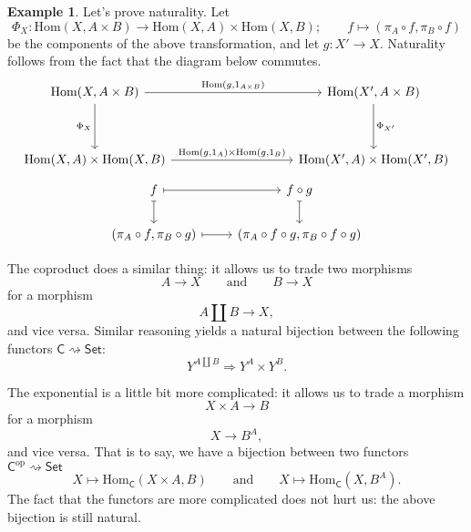 \documentclass[a4paper]{report}
\newcommand{\Hom}{\mathrm{Hom}}
\theoremstyle{definition}
\newtheorem{example}{Example}[section]
\theoremstyle{plain}
\theoremstyle{remark}
\begin{document}
\begin{example}
  Let's prove naturality. Let
  \begin{equation*}
    \Phi_{X}\colon \Hom(X, A \times B) \to \Hom(X, A) \times \Hom(X, B);\qquad f \mapsto (\pi_{A} \circ f, \pi_{B} \circ f)
  \end{equation*}
  be the components of the above transformation, and let $g\colon X' \to X$. Naturality follows from the fact that the diagram below commutes.
  \begin{equation*}
    \begin{tikzcd}[row sep=huge, column sep=huge]
      \Hom(X, A \times B)
      \arrow[rr, "{\Hom(g, 1_{A \times B})}"]
      \arrow[d, swap, "\Phi_{X}"]
      & & \Hom(X', A \times B)
      \arrow[d, "\Phi_{X'}"]
      \\
      \Hom(X, A) \times \Hom(X, B)
      \arrow[rr, "{\Hom(g, 1_{A}) \times \Hom(g, 1_{B})}"]
      & & \Hom(X', A) \times \Hom(X', B)
    \end{tikzcd}
  \end{equation*}
  \begin{equation*}
    \begin{tikzcd}
      f
      \arrow[r, mapsto]
      \arrow[d, mapsto]
      & f \circ g
      \arrow[d, mapsto]
      \\
      (\pi_{A} \circ f, \pi_{B} \circ g)
      \arrow[r, mapsto]
      & (\pi_{A} \circ f \circ g, \pi_{B} \circ f \circ g)
    \end{tikzcd}
  \end{equation*}

  The coproduct does a similar thing: it allows us to trade two morphisms
  \begin{equation*}
    A \to X\qquad\text{and}\qquad B \to X
  \end{equation*}
  for a morphism
  \begin{equation*}
    A \amalg B \to X,
  \end{equation*}
  and vice versa. Similar reasoning yields a natural bijection between the following functors $\mathsf{C} \rightsquigarrow \mathsf{Set}$:
  \begin{equation*}
    Y^{A \amalg B} \Rightarrow Y^{A} \times Y^{B}.
  \end{equation*}

  The exponential is a little bit more complicated: it allows us to trade a morphism
  \begin{equation*}
    X \times A \to B
  \end{equation*}
  for a morphism 
  \begin{equation*}
    X \to B^{A},
  \end{equation*}
  and vice versa.  That is to say, we have a bijection between two functors $\mathsf{C}^{\mathrm{op}} \rightsquigarrow \mathsf{Set}$
  \begin{equation*}
    X \mapsto \Hom_{\mathsf{C}}(X \times A, B)\qquad\text{and}\qquad X \mapsto \Hom_{\mathsf{C}}(X, B^{A}).
  \end{equation*}
  The fact that the functors are more complicated does not hurt us: the above bijection is still natural.
\end{example}
\end{document}
